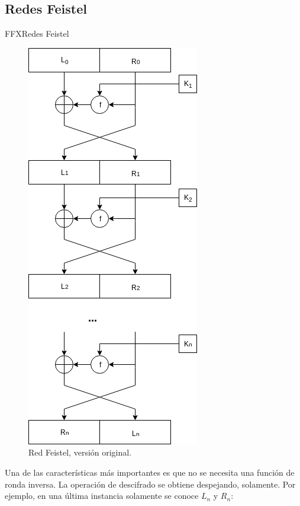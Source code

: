 %
%

\subsection{Redes Feistel}

\begin{frame}{FFX}{Redes Feistel}

  {
    \begin{figure}[H]
      \begin{center}
        \includegraphics[height=0.7\textheight]
          {../../../diagramas_comunes/redes_feistel/feistel.png}
        \caption{Red Feistel, versión original.}
      \end{center}
    \end{figure}
  }

  {
    Una de las características más importantes es que no se necesita una
    función de ronda inversa. La operación de descifrado se obtiene
    despejando, solamente. Por ejemplo, en una última instancia solamente se
    conoce $ L_n $ y $ R_n $:

}
\end{frame}
